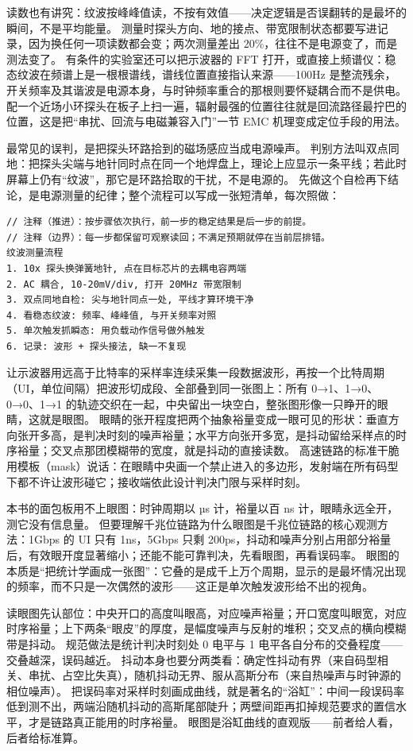 读数也有讲究：纹波按峰峰值读，不按有效值——决定逻辑是否误翻转的是最坏的瞬间，不是平均能量。
测量时探头方向、地的接点、带宽限制状态都要写进记录，因为换任何一项读数都会变；两次测量差出 20\%，往往不是电源变了，而是测法变了。
有条件的实验室还可以把示波器的 FFT 打开，或直接上频谱仪：稳态纹波在频谱上是一根根谱线，谱线位置直接指认来源——100Hz 是整流残余，开关频率及其谐波是电源本身，与时钟频率重合的那根则要怀疑耦合而不是供电。
配一个近场小环探头在板子上扫一遍，辐射最强的位置往往就是回流路径最拧巴的位置，这是把“串扰、回流与电磁兼容入门”一节 EMC 机理变成定位手段的用法。

最常见的误判，是把探头环路拾到的磁场感应当成电源噪声。
判别方法叫双点同地：把探头尖端与地针同时点在同一个地焊盘上，理论上应显示一条平线；若此时屏幕上仍有“纹波”，那它是环路拾取的干扰，不是电源的。
先做这个自检再下结论，是电源测量的纪律；整个流程可以写成一张短清单，每次照做：

\begin{lstlisting}
// 注释（推进）：按步骤依次执行，前一步的稳定结果是后一步的前提。
// 注释（边界）：每一步都保留可观察读回；不满足预期就停在当前层排错。
纹波测量流程
1. 10x 探头换弹簧地针, 点在目标芯片的去耦电容两端
2. AC 耦合, 10-20mV/div, 打开 20MHz 带宽限制
3. 双点同地自检: 尖与地针同点一处, 平线才算环境干净
4. 看稳态纹波: 频率、峰峰值, 与开关频率对照
5. 单次触发抓瞬态: 用负载动作信号做外触发
6. 记录: 波形 + 探头接法, 缺一不复现
\end{lstlisting}

让示波器用远高于比特率的采样率连续采集一段数据波形，再按一个比特周期（UI，单位间隔）把波形切成段、全部叠到同一张图上：所有 0→1、1→0、0→0、1→1 的轨迹交织在一起，中央留出一块空白，整张图形像一只睁开的眼睛，这就是眼图。
眼睛的张开程度把两个抽象裕量变成一眼可见的形状：垂直方向张开多高，是判决时刻的噪声裕量；水平方向张开多宽，是抖动留给采样点的时序裕量；交叉点那团模糊带的宽度，就是抖动的直接读数。
高速链路的标准干脆用模板（mask）说话：在眼睛中央画一个禁止进入的多边形，发射端在所有码型下都不许让波形碰它；接收端依此设计判决门限与采样时刻。

本书的面包板用不上眼图：时钟周期以 µs 计，裕量以百 ns 计，眼睛永远全开，测它没有信息量。
但要理解千兆位链路为什么眼图是千兆位链路的核心观测方法：1Gbps 的 UI 只有 1ns，5Gbps 只剩 200ps，抖动和噪声分别占用部分裕量后，有效眼开度显著缩小；还能不能可靠判决，先看眼图，再看误码率。
眼图的本质是“把统计学画成一张图”：它叠的是成千上万个周期，显示的是最坏情况出现的频率，而不只是一次偶然的波形——这正是单次触发波形给不出的视角。

读眼图先认部位：中央开口的高度叫眼高，对应噪声裕量；开口宽度叫眼宽，对应时序裕量；上下两条“眼皮”的厚度，是幅度噪声与反射的堆积；交叉点的横向模糊带是抖动。
规范做法是统计判决时刻处 0 电平与 1 电平各自分布的交叠程度——交叠越深，误码越近。
抖动本身也要分两类看：确定性抖动有界（来自码型相关、串扰、占空比失真），随机抖动无界、服从高斯分布（来自热噪声与时钟源的相位噪声）。
把误码率对采样时刻画成曲线，就是著名的“浴缸”：中间一段误码率低到测不出，两端沿随机抖动的高斯尾部陡升；两壁间距再扣掉规范要求的置信水平，才是链路真正能用的时序裕量。
眼图是浴缸曲线的直观版——前者给人看，后者给标准算。

